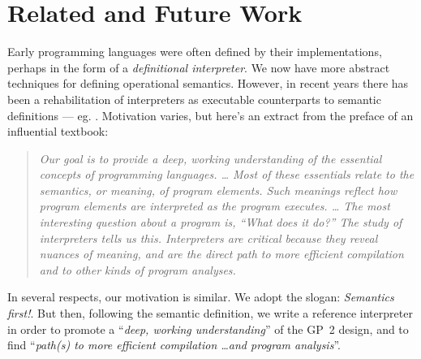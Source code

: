 \section{Related and Future Work}
\label{sec:relatedandfuture}
Early programming languages were often defined by their implementations,
perhaps in the form of a \emph{definitional interpreter}.
We now have more abstract techniques for defining operational semantics.
However, in recent years there has been a 
rehabilitation of interpreters as executable counterparts to semantic
definitions --- eg. \cite{Campbell2012}. 
Motivation varies, but here's an extract from the preface
of an influential textbook: 
\begin{quote}
\textit{Our goal is to provide a deep, working understanding of the essential concepts of programming languages. \ldots
Most of these essentials relate to the semantics, or meaning, of program elements. Such meanings reflect how program elements are interpreted as the program executes. \ldots
The most interesting question about a program is, \textnormal{``What does it do?''} The study of interpreters tells us this. Interpreters are critical because they reveal nuances of meaning, and are the direct path to more efficient compilation and to other kinds of program analyses.} \cite{Friedmanetal2008}
\end{quote}
In several respects, our motivation is similar.
We adopt the slogan: \emph{Semantics first!}.
But then, following the semantic definition, we write a reference interpreter in order to
promote a ``\textit{deep, working understanding}'' of the GP~2 design,
and to find ``\textit{path(s) to more efficient compilation \ldots and program analysis}''.

